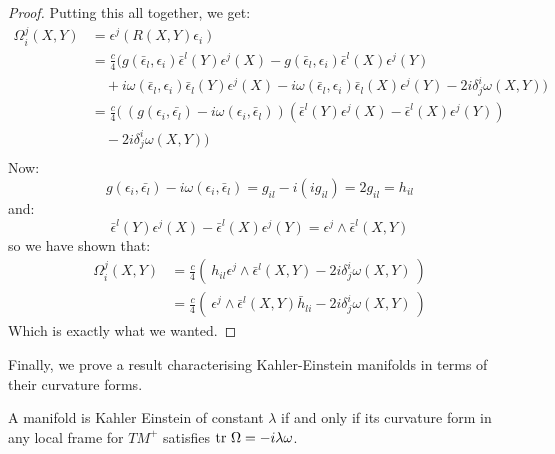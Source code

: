 \begin{proof}
Putting this all together, we get:
%
\begin{align*}
\Omega^j_i (X,Y) &= \epsilon^j ( R(X,Y) \epsilon_i ) \\
%
&= \frac{c}{4} (g( \bar{ \epsilon }_l, \epsilon_i ) \bar{ \epsilon }^l (Y) \epsilon^j(X) - g( \bar{\epsilon}_l, \epsilon_i ) \bar{ \epsilon }^l (X) \epsilon^j (Y) \\
& \quad + i \omega( \bar{ \epsilon }_l, \epsilon_i ) \bar{ \epsilon }_l (Y) \epsilon^j (X) - i \omega( \bar{ \epsilon }_l, \epsilon_i ) \bar{ \epsilon }_l (X) \epsilon^j (Y) - 2 i \delta^i_j \omega( X, Y )) \\
%
&= \frac{c}{4}( \ ( g( \epsilon_i, \bar{ \epsilon_l } ) - i \omega( \epsilon_i, \bar{ \epsilon }_l ) )( \bar{ \epsilon }^l (Y) \epsilon^j (X) - \bar{ \epsilon }^l (X) \epsilon^j (Y)) \\
& \quad - 2 i \delta^i_j \omega( X, Y )) \\
\end{align*}
%
Now:
%
$$ g( \epsilon_i, \bar{ \epsilon_l } ) - i \omega( \epsilon_i, \bar{ \epsilon }_l ) = g_{il} - i( i g_{il} ) = 2 g_{il} = h_{il} $$
%
and:
%
$$ \bar{ \epsilon }^l (Y) \epsilon^j (X) - \bar{ \epsilon }^l (X) \epsilon^j (Y) = \epsilon^j \wedge \bar{ \epsilon }^l (X,Y) $$
%
so we have shown that:
%
\begin{align*}
\Omega^j_i (X,Y) &= \frac{c}{4} ( \ h_{il} \epsilon^j \wedge \bar{ \epsilon }^l (X,Y) - 2 i \delta^i_j \omega( X, Y ) \ ) \\
&= \frac{c}{4} ( \ \epsilon^j \wedge \bar{ \epsilon }^l (X,Y) \bar{h}_{li} - 2 i \delta^i_j \omega( X, Y ) \ )
\end{align*}
%
Which is exactly what we wanted.
%
\end{proof}

Finally, we prove a result characterising Kahler-Einstein manifolds in terms of their curvature forms.

\begin{prop}
A manifold is Kahler Einstein of constant $\lambda$ if and only if its curvature form in any local frame for $TM^{+}$ satisfies $ \text{tr} \ \Omega =  - i \lambda \omega $.
\end{prop}

